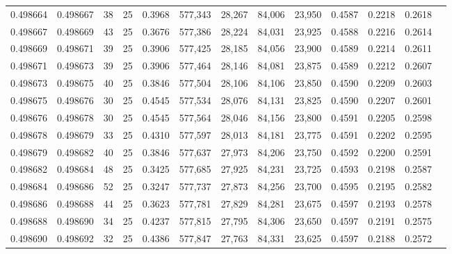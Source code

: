\begin{tabular}{rrrrrrrrrrrrr}
0.498664 & 0.498667 &    38 &  25 &                                     0.3968 & 577,343 &  28,267 &  84,006 &  23,950 & 0.4587 & 0.2218 & 0.2618 \\
0.498667 & 0.498669 &    43 &  25 &                                     0.3676 & 577,386 &  28,224 &  84,031 &  23,925 & 0.4588 & 0.2216 & 0.2614 \\
0.498669 & 0.498671 &    39 &  25 &                                     0.3906 & 577,425 &  28,185 &  84,056 &  23,900 & 0.4589 & 0.2214 & 0.2611 \\
0.498671 & 0.498673 &    39 &  25 &                                     0.3906 & 577,464 &  28,146 &  84,081 &  23,875 & 0.4589 & 0.2212 & 0.2607 \\
0.498673 & 0.498675 &    40 &  25 &                                     0.3846 & 577,504 &  28,106 &  84,106 &  23,850 & 0.4590 & 0.2209 & 0.2603 \\
0.498675 & 0.498676 &    30 &  25 &                                     0.4545 & 577,534 &  28,076 &  84,131 &  23,825 & 0.4590 & 0.2207 & 0.2601 \\
0.498676 & 0.498678 &    30 &  25 &                                     0.4545 & 577,564 &  28,046 &  84,156 &  23,800 & 0.4591 & 0.2205 & 0.2598 \\
0.498678 & 0.498679 &    33 &  25 &                                     0.4310 & 577,597 &  28,013 &  84,181 &  23,775 & 0.4591 & 0.2202 & 0.2595 \\
0.498679 & 0.498682 &    40 &  25 &                                     0.3846 & 577,637 &  27,973 &  84,206 &  23,750 & 0.4592 & 0.2200 & 0.2591 \\
0.498682 & 0.498684 &    48 &  25 &                                     0.3425 & 577,685 &  27,925 &  84,231 &  23,725 & 0.4593 & 0.2198 & 0.2587 \\
0.498684 & 0.498686 &    52 &  25 &                                     0.3247 & 577,737 &  27,873 &  84,256 &  23,700 & 0.4595 & 0.2195 & 0.2582 \\
0.498686 & 0.498688 &    44 &  25 &                                     0.3623 & 577,781 &  27,829 &  84,281 &  23,675 & 0.4597 & 0.2193 & 0.2578 \\
0.498688 & 0.498690 &    34 &  25 &                                     0.4237 & 577,815 &  27,795 &  84,306 &  23,650 & 0.4597 & 0.2191 & 0.2575 \\
0.498690 & 0.498692 &    32 &  25 &                                     0.4386 & 577,847 &  27,763 &  84,331 &  23,625 & 0.4597 & 0.2188 & 0.2572 \\

\end{tabular}

